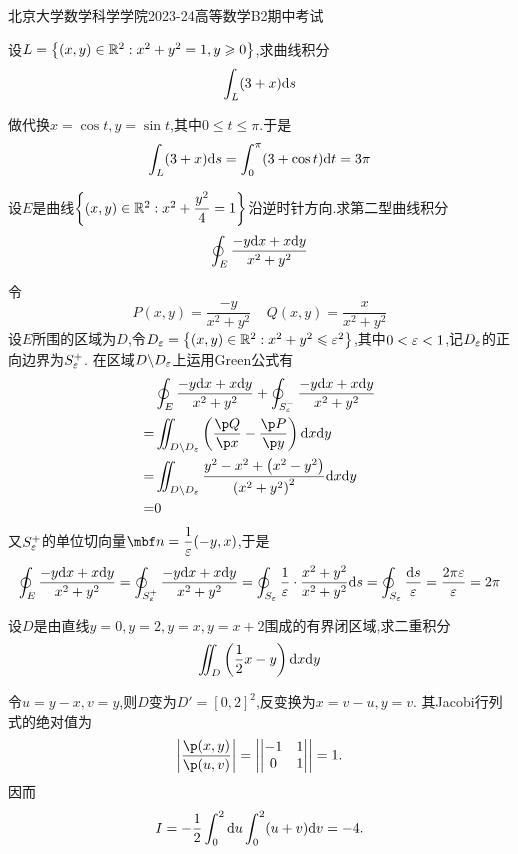 \documentclass{ctexart}
\begin{document}
\pagestyle{empty}
\begin{center}\Large
    北京大学数学科学学院2023-24高等数学B2期中考试
\end{center}
\begin{problem}[1.(10\songti{分})]
    设$L=\left\{(x,y)\in\mathbb{R}^2:x^2+y^2=1,y\geqslant0\right\}$,求曲线积分
    \[\int_{L}(3+x)\mathrm{d} s\]

\end{problem}
\begin{solution}
    做代换$x=\cos t,y=\sin t$,其中$0\leqslant t\leqslant \pi$.于是
    \[\int_L(3+x)\mathrm{d} s=\int_0^{\pi}(3+\cos t)\mathrm{d} t=3\pi\]

\end{solution}
\begin{problem}[2.(10\songti{分})]
    设$E$是曲线$\left\{(x,y)\in\mathbb{R}^2:x^2+\dfrac{y^2}{4}=1\right\}$沿逆时针方向.求第二型曲线积分
    \[\oint_{E}\dfrac{-y\mathrm{d} x+x\mathrm{d} y}{x^2+y^2}\]

\end{problem}
\begin{solution}
    令
    \[P(x,y)=\dfrac{-y}{x^2+y^2}\ \ \ \ \ Q(x,y)=\dfrac{x}{x^2+y^2}\]
    设$E$所围的区域为$D$,令$D_\varepsilon=\left\{(x,y)\in\mathbb{R}^2:x^2+y^2\leqslant\varepsilon^2\right\}$,其中$0<\varepsilon<1$,记$D_\varepsilon$的正向边界为$S_{\varepsilon}^+$.%
    在区域$D\backslash D_\varepsilon$上运用Green公式有
    \[\begin{aligned}
        &\oint_{E}\dfrac{-y\di x+x\di y}{x^2+y^2}+\oint_{S_{\ep}^-}\dfrac{-y\di x+x\di y}{x^2+y^2}\\
        =&\iint_{D\backslash D_\ep}\left(\dfrac{\p Q}{\p x}-\dfrac{\p P}{\p y}\right)\dx\di y \\
        =&\iint_{D\backslash D_\ep}\dfrac{y^2-x^2+\left(x^2-y^2\right)}{\left(x^2+y^2\right)^2}\dx\di y \\
        =&0
    \end{aligned}\]
    又$S_{\varepsilon}^+$的单位切向量$\mbf n=\dfrac{1}{\ep}(-y,x)$,于是
    \[\oint_{E}\dfrac{-y\mathrm{d} x+x\mathrm{d} y}{x^2+y^2}
    =\oint_{S_{\varepsilon}^+}\dfrac{-y\mathrm{d} x+x\mathrm{d} y}{x^2+y^2}
    =\oint_{S_\varepsilon}\dfrac1{\varepsilon}\cdot\dfrac{x^2+y^2}{x^2+y^2}\mathrm{d} s
    =\oint_{S_\varepsilon}\dfrac{\mathrm{d} s}{\varepsilon}=\dfrac{2\pi\varepsilon}{\varepsilon}=2\pi\]

\end{solution}
\begin{problem}[3.(10\songti{分})]
    设$D$是由直线$y=0,y=2,y=x,y=x+2$围成的有界闭区域,求二重积分
    \[\iint_D\left(\dfrac12x-y\right)\mathrm{d} x\mathrm{d} y\]

\end{problem}
\begin{solution}
令$u=y-x,v=y$,则$D$变为$D'=[0,2]^2$,反变换为$x=v-u,y=v$.
    其Jacobi行列式的绝对值为
    \[\left|\dfrac{\p(x,y)}{\p(u,v)}\right|=\left|\begin{vmatrix}-1&1\\0&1\end{vmatrix}\right|=1.\]
    因而
    \[I=-\dfrac12\int_0^2\mathrm{d} u\int_0^2(u+v)\mathrm{d} v=-4.\]
\end{solution}
\end{document}
